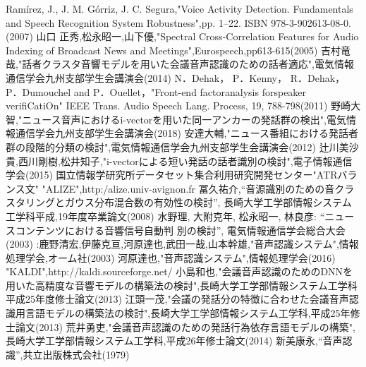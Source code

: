 \begin{thebibliography}{99}     %
Ramírez, J., J. M. Górriz, J. C. Segura,"Voice Activity Detection. Fundamentals and Speech Recognition System Robustness",pp. 1–22. ISBN 978-3-902613-08-0.(2007)
山口 正秀,松永昭一,山下優,"Spectral Cross-Correlation Features for Audio Indexing of Broadcast News and Meetings",Eurospeech,pp613-615(2005)
吉村竜哉,"話者クラスタ音響モデルを用いた会議音声認識のための話者適応",電気情報通信学会九州支部学生会講演会(2014)
N．Dehak， P．Kenny， R．Dehak， P．Dumouchel and P．Ouellet，"Front-end factoranalysis forspeaker verifiCatiOn" IEEE Trans. Audio Speech Lang. Process, 19, 788-798(2011)
野崎大智,"ニュース音声におけるi-vectorを用いた同一アンカーの発話群の検出",電気情報通信学会九州支部学生会講演会(2018)
安達大輔,"ニュース番組における発話者群の段階的分類の検討",電気情報通信学会九州支部学生会講演会(2012)
辻川美沙貴,西川剛樹,松井知子,"i-vectorによる短い発話の話者識別の検討",電子情報通信学会(2015)
国立情報学研究所データセット集合利用研究開発センター"ATRバランス文"
"ALIZE",http:/alize.univ-avignon.fr
冨久祐介,“音源識別のための音クラスタリングとガウス分布混合数の有効性の検討”,
長崎大学工学部情報システム工学科平成,19年度卒業論文(2008)
水野理, 大附克年, 松永昭一, 林良彦: “ニュースコンテンツにおける音響信号自動判
別の検討”, 電気情報通信学会総合大会(2003)
:鹿野清宏,伊藤克亘,河原達也,武田一哉,山本幹雄,"音声認識システム",情報処理学会,オーム社(2003)
河原達也,"音声認識システム",情報処理学会(2016)
"KALDI",http://kaldi.sourceforge.net/
小島和也,"会議音声認識のためのDNNを用いた高精度な音響モデルの構築法の検討",長崎大学工学部情報システム工学科 平成25年度修士論文(2013)
江頭一茂,"会議の発話分の特徴に合わせた会議音声認識用言語モデルの構築法の検討",長崎大学工学部情報システム工学科,平成25年修士論文(2013)
荒井勇吏,"会議音声認識のための発話行為依存言語モデルの構築",長崎大学工学部情報システム工学科,平成26年修士論文(2014)
新美康永,“音声認識”,共立出版株式会社(1979)
\end{thebibliography}
